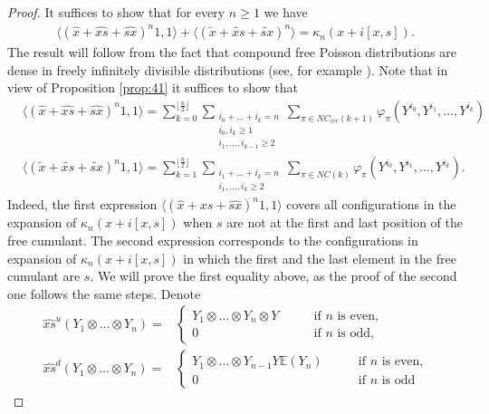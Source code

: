 \documentclass{amsart}
\begin{document}
	\begin{proof}
	It suffices to show that  for every $n\geq 1$ we have
		\begin{align*}
			\langle (\widehat{x}+\widehat{xs}+\widehat{sx})^n 1,1\rangle+
			\langle (\widetilde{x}+\widetilde{xs}+\widetilde{sx})^n\rangle=\kappa_n(x+i[x,s]).
		\end{align*}
		The result will follow from the fact that compound free Poisson distributions are dense in freely infinitely divisible distributions (see, for example \cite{nisp}). Note that in view of Proposition \ref{prop:41} it suffices to show that
		\begin{align*}
			&	\langle (\widehat{x}+\widehat{xs}+\widehat{sx})^n 1,1\rangle=\sum_{k=0}^{\lfloor\tfrac{n}{2}\rfloor} \sum_{\substack{i_0+\ldots+i_k=n\\i_0,i_k\geq 1\\i_1,\ldots,i_{k-1}\geq 2}} \sum_{\pi\in NC_{irr}(k+1)}\varphi_\pi (Y^{i_0},Y^{i_1},\ldots,Y^{i_k})\\
		&	\langle 
			(\widetilde{x}+\widetilde{xs}+\widetilde{sx})^n
			 1,1\rangle=\sum_{k=1}^{\lfloor\tfrac{n}{2}\rfloor} \sum_{\substack{i_1+\ldots+i_k=n\\i_1,\ldots,i_{k}\geq 2}} \sum_{\pi\in NC(k)}\varphi_\pi (Y^{i_0},Y^{i_1},\ldots,Y^{i_k}).
		\end{align*}
Indeed, the first expression
 $\langle (\widehat{x}+\widehat{xs}+\widehat{sx})^n 1,1\rangle$
 covers all configurations in the expansion of $\kappa_n(x+i[x,s])$  when $s$ are not at the first and last position of the free cumulant. The second expression corresponds to the configurations in expansion of $\kappa_n(x+i[x,s])$ in which the first and the last element in the free cumulant are $s$.
We will prove the first equality above, as the proof of the second one follows the same steps.
Denote 
\begin{align*}
	\widehat{xs}^u\left(Y_1\otimes\ldots\otimes Y_n\right)=&\begin{cases}
		Y_1\otimes\ldots\otimes Y_n\otimes Y\qquad &\mbox{if $n$ is even,}\\
		0 \qquad &\mbox{if $n$ is odd,}
	\end{cases}
\\
	\widehat{xs}^d\left(Y_1\otimes\ldots\otimes Y_n\right)=&\begin{cases}
		Y_1\otimes\ldots\otimes Y_{n-1}Y\mathbb{E}(Y_n)\qquad &\mbox{if $n$ is even,}\\
		0 \qquad &\mbox{if $n$ is odd}
	\end{cases}
\end{align*}


\end{proof}
\end{document}
